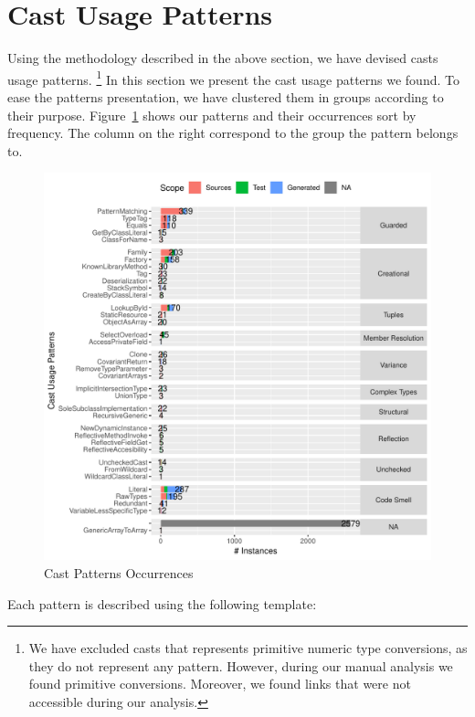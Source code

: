 \section{Cast Usage Patterns}
\label{sec:casts:patterns}

Using the methodology described in the above section, we have devised \npattern{} casts usage patterns.%
\footnote{We have excluded casts that represents primitive numeric type conversions, as they do not represent any pattern.
However, during our manual analysis we found \nprim{} primitive conversions.
Moreover, we found \nbrokenlinks{} links that were not accessible during our analysis.}
In this section we present the cast usage patterns we found.
To ease the patterns presentation, we have clustered them in \ngroup{} groups according to their purpose.
Figure~\ref{fig:patterns} shows our patterns and their occurrences sort by frequency.
The column on the right correspond to the group the pattern belongs to.

\begin{figure}[ht!]
\centering
\includegraphics[width=\textwidth]{analysis/table-patterns-5000.pdf}
\caption{Cast Patterns Occurrences} \label{fig:patterns}
\end{figure}

Each pattern is described using the following template:

